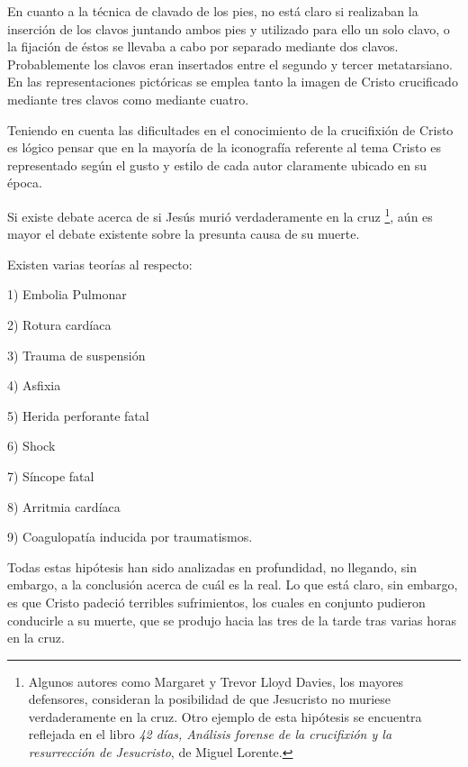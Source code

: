 En cuanto a la técnica de clavado de los pies, no está claro si realizaban la inserción de los clavos juntando ambos pies y utilizado para ello un solo clavo, o la fijación de éstos se llevaba a cabo por separado mediante dos clavos. Probablemente los clavos eran insertados entre el segundo y tercer metatarsiano. En las representaciones pictóricas se emplea tanto la imagen de Cristo crucificado mediante tres clavos como mediante cuatro.

Teniendo en cuenta las dificultades en el conocimiento de la crucifixión de Cristo es lógico pensar que en la mayoría de la iconografía referente al tema Cristo es representado según el gusto y estilo de cada autor claramente ubicado en su época.


Si existe debate acerca de si Jesús murió verdaderamente en la cruz \footnote{Algunos autores como Margaret y Trevor Lloyd Davies, los mayores defensores, consideran la posibilidad de que Jesucristo no muriese verdaderamente en la cruz. Otro ejemplo de esta hipótesis se encuentra reflejada en el libro \textit{42 días, Análisis forense de la crucifixión y la resurrección de Jesucristo}, de Miguel Lorente.}, aún es mayor el debate existente sobre la presunta causa de su muerte.

Existen varias teorías al respecto:

1) Embolia Pulmonar

2) Rotura cardíaca

3) Trauma de suspensión

4) Asfixia

5) Herida perforante fatal

6) Shock

7) Síncope fatal

8) Arritmia cardíaca

9) Coagulopatía inducida por traumatismos.

Todas estas hipótesis han sido analizadas en profundidad, no llegando, sin embargo, a la conclusión acerca de cuál es la real. Lo que está claro, sin embargo, es que Cristo padeció terribles sufrimientos, los cuales en conjunto pudieron conducirle a su muerte, que se produjo hacia las tres de la tarde tras varias horas en la cruz.


